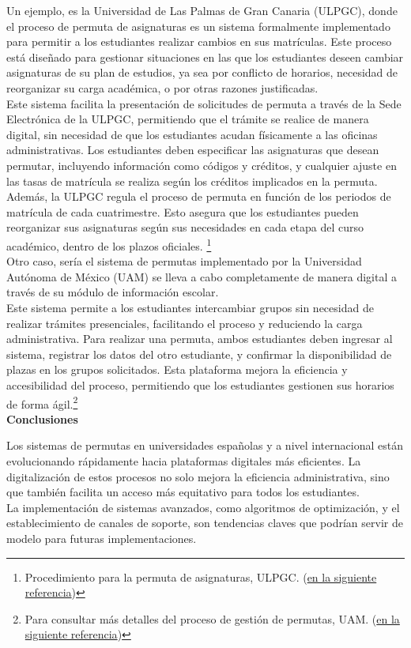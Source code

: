 Un ejemplo, es la Universidad de Las Palmas de Gran Canaria (ULPGC), donde el proceso de permuta de asignaturas es un sistema formalmente implementado para permitir a los estudiantes realizar cambios en sus matrículas. Este proceso está diseñado para gestionar situaciones en las que los estudiantes deseen cambiar asignaturas de su plan de estudios, ya sea por conflicto de horarios, necesidad de reorganizar su carga académica, o por otras razones justificadas.\\
Este sistema facilita la presentación de solicitudes de permuta a través de la Sede Electrónica de la ULPGC, permitiendo que el trámite se realice de manera digital, sin necesidad de que los estudiantes acudan físicamente a las oficinas administrativas. Los estudiantes deben especificar las asignaturas que desean permutar, incluyendo información como códigos y créditos, y cualquier ajuste en las tasas de matrícula se realiza según los créditos implicados en la permuta.\\
Además, la ULPGC regula el proceso de permuta en función de los periodos de matrícula de cada cuatrimestre. Esto asegura que los estudiantes pueden reorganizar sus asignaturas según sus necesidades en cada etapa del curso académico, dentro de los plazos oficiales. \footnote{Procedimiento para la permuta de asignaturas, ULPGC. (\href{https://www.ulpgc.es/sites/default/files/ArchivosULPGC/adm_eet/tramite_de_permutas.pdf}{en la siguiente referencia})}\\ 

Otro caso, sería el sistema de permutas implementado por la Universidad Autónoma de México (UAM) se lleva a cabo completamente de manera digital a través de su módulo de información escolar.\\
Este sistema permite a los estudiantes intercambiar grupos sin necesidad de realizar trámites presenciales, facilitando el proceso y reduciendo la carga administrativa. Para realizar una permuta, ambos estudiantes deben ingresar al sistema, registrar los datos del otro estudiante, y confirmar la disponibilidad de plazas en los grupos solicitados. Esta plataforma mejora la eficiencia y accesibilidad del proceso, permitiendo que los estudiantes gestionen sus horarios de forma ágil.\footnote{Para consultar más detalles del proceso de gestión de permutas, UAM. (\href{https://www.ulpgc.es/sites/default/files/ArchivosULPGC/adm_eet/tramite_de_permutas.pdf}{en la siguiente referencia})}\\

\textbf{Conclusiones}

Los sistemas de permutas en universidades españolas y a nivel internacional están evolucionando rápidamente hacia plataformas digitales más eficientes. La digitalización de estos procesos no solo mejora la eficiencia administrativa, sino que también facilita un acceso más equitativo para todos los estudiantes.\\
La implementación de sistemas avanzados, como algoritmos de optimización, y el establecimiento de canales de soporte, son tendencias claves que podrían servir de modelo para futuras implementaciones.                                                                                                                                                                                              